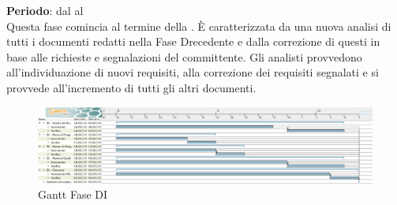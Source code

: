 \textbf{Periodo}: dal  al  \\
Questa fase comincia al termine della . È caratterizzata da una nuova analisi di tutti i documenti redatti nella Fase Drecedente e dalla correzione di questi in base alle richieste e segnalazioni del committente. Gli analisti provvedono all'individuazione di nuovi requisiti, alla correzione dei requisiti segnalati e si provvede all'incremento di tutti gli altri documenti.
\begin{center}
	\begin{figure}[H]\centering
		\includegraphics[width=\textwidth]{PianoDiProgetto/Pics/FaseDI.png}
		\caption{Gantt Fase DI}
	\end{figure}
\end{center}
